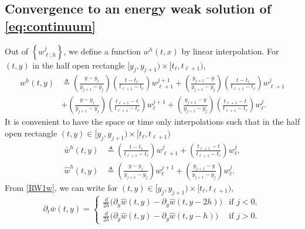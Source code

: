 \documentclass[a4paper,11pt]{article}
\theoremstyle{remark}
\begin{document}
\subsection{Convergence to an energy weak solution of \eqref{eq:continuum}}
Out of $\left\{w^j_{\ell;h}\right\}$, we define a function $w^h(t,x)$ by linear interpolation.
For $(t,y)$ in the half open rectangle $[y_j, y _{j+1}) \times [t_\ell, t _{\ell+1})$,
\begin{equation} \label{linear}
\begin{aligned}
 w^h(t,y)&\triangleq \left(\tfrac{y-y_j}{y_{j+1}-y_j} \right)\left(\tfrac{t-t_\ell}{t_{\ell+1}-t_\ell} \right) w_{\ell+1}^{j+1} + \left(\tfrac{y_{j+1}-y}{y_{j+1}-y_j} \right)\left(\tfrac{t-t_\ell}{t_{\ell+1}-t_\ell} \right) w_{\ell+1}^{j}\\
 &+ \left(\tfrac{y-y_j}{y_{j+1}-y_j} \right)\left(\tfrac{t_{\ell+1}-t}{t_{\ell+1}-t_\ell} \right) w_{\ell}^{j+1} + \left(\tfrac{y_{j+1}-y}{y_{j+1}-y_j} \right)\left(\tfrac{t_{\ell+1}-t}{t_{\ell+1}-t_\ell} \right) w_{\ell}^{j}. 
 \end{aligned}
\end{equation}
It is convenient to have the space or time only interpolations such that in the half open rectangle $(t,y)\in[y_j, y _{j+1}) \times [t_\ell, t _{\ell+1})$
\begin{equation} \label{linear0}
\begin{aligned}
 \bar w^h(t,y)&\triangleq \left(\tfrac{t-t_\ell}{t_{\ell+1}-t_\ell} \right) w_{\ell+1}^{j} + \left(\tfrac{t_{\ell+1}-t}{t_{\ell+1}-t_\ell} \right) w_{\ell}^{j},\\
 \hat w^h(t,y)&\triangleq \left(\tfrac{y-y_j}{y_{j+1}-y_j} \right) w_{\ell}^{j+1} + \left(\tfrac{y_{j+1}-y}{y_{j+1}-y_j} \right) w_{\ell}^{j}.
 \end{aligned}
\end{equation}
From \eqref{RW1w}, we can write for $(t,y) \in [y_j, y _{j+1}) \times [t_\ell, t _{\ell+1})$,
\begin{equation}
 \partial_t \bar{w}(t,y) = \left\{\begin{array}{ll}
                            \frac{d}{2h}\big(\partial_y\hat{w}(t,y)-\partial_y\hat{w}(t,y-2h)\big) & \text{if } j<0,\\
                            \frac{d}{2h}\big(\partial_y\hat{w}(t,y)-\partial_y\hat{w}(t,y-h)\big) & \text{if } j>0.
                           \end{array}\right.
\end{equation}
\end{document}
